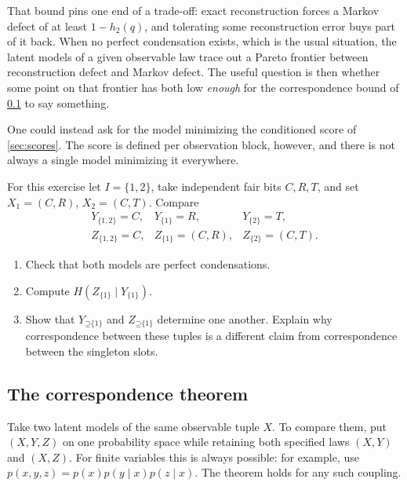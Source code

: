 \documentclass[11pt]{article}
\newcommand{\Up}{\mathord{\supseteq}}
\begin{document}
That bound pins one end of a trade-off: exact reconstruction forces a Markov
defect of at least $1-h_2(q)$, and tolerating some reconstruction error buys
part of it back. When no perfect condensation exists, which is the usual
situation, the latent models of a given observable law trace out a Pareto
frontier between reconstruction defect and Markov defect. The useful question
is then whether some point on that frontier has both low \emph{enough} for the
correspondence bound of \cref{sec:correspondence} to say something.

\begin{remark}
One could instead ask for the model minimizing the conditioned score of
\cref{sec:scores}. The score is defined per observation block, however, and
there is not always a single model minimizing it everywhere.
\end{remark}

\begin{exercise}
\label{ex:duplicates}\important
For this exercise let $I=\{1,2\}$, take independent fair bits $C,R,T$, and set
$X_1=(C,R)$, $X_2=(C,T)$. Compare
\[
\begin{array}{lll}
 Y_{\{1,2\}}=C,&Y_{\{1\}}=R,&Y_{\{2\}}=T,\\
 Z_{\{1,2\}}=C,&Z_{\{1\}}=(C,R),&Z_{\{2\}}=(C,T).
\end{array}
\]
\begin{enumerate}
\item Check that both models are perfect condensations.
\item Compute $H(Z_{\{1\}}\mid Y_{\{1\}})$.
\item Show that $Y_{\Up\{1\}}$ and $Z_{\Up\{1\}}$ determine one
another. Explain why correspondence between these tuples is a different
claim from correspondence between the singleton slots.
\end{enumerate}
\end{exercise}

\subsection{The correspondence theorem}
\label{sec:correspondence}
Take two latent models of the same observable tuple $X$. To compare them,
put $(X,Y,Z)$ on one probability space while retaining both specified laws
$(X,Y)$ and $(X,Z)$. For finite variables this is always possible: for example,
use $p(x,y,z)=p(x)p(y\mid x)p(z\mid x)$. The theorem holds for any such
coupling.
\end{document}
